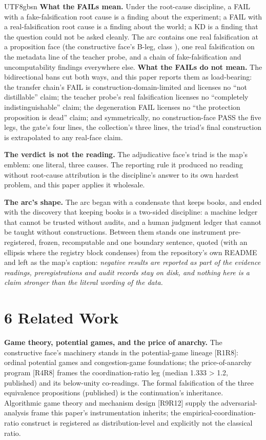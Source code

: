 \documentclass[11pt,letterpaper]{article}
\begin{document}
\begin{CJK}{UTF8}{gbsn}
\textbf{What the FAILs mean.} Under the root-cause discipline, a FAIL with a fake-falsification root cause is a finding about the experiment; a FAIL with a real-falsification root cause is a finding about the world; a KD is a finding that the question could not be asked cleanly. The arc contains one real falsification at a proposition face (the constructive face's B-leg, class ), one real falsification on the metadata line of the teacher probe, and a chain of fake-falsification and uncomputability findings everywhere else. \textbf{What the FAILs do not mean.} The bidirectional bans cut both ways, and this paper reports them as load-bearing: the transfer chain's FAIL is construction-domain-limited and licenses no ``not distillable'' claim; the teacher probe's real falsification licenses no ``completely indistinguishable'' claim; the degeneration FAIL licenses no ``the protection proposition is dead'' claim; and symmetrically, no construction-face PASS \textemdash{} the five legs, the gate's four lines, the collection's three lines, the triad's final construction \textemdash{} is extrapolated to any real-face claim.

\textbf{The verdict is not the reading.} The adjudicative face's triad is the map's emblem: one literal, three causes. The reporting rule it produced \textemdash{} no reading without root-cause attribution \textemdash{} is the discipline's answer to its own hardest problem, and this paper applies it wholesale.

\textbf{The arc's shape.} The arc began with a condensate that keeps books, and ended with the discovery that keeping books is a two-sided discipline: a machine ledger that cannot be trusted without audits, and a human judgment ledger that cannot be taught without constructions. Between them stands one instrument \textemdash{} pre-registered, frozen, recomputable \textemdash{} and one boundary sentence, quoted (with an ellipsis where the registry block condenses) from the repository's own README and left as the map's caption: \emph{negative results are reported as part of the evidence \textellipsis{}readings, preregistrations and audit records stay on disk, and nothing here is a claim stronger than the literal wording of the data.}

\section*{6 Related Work}

\textbf{Game theory, potential games, and the price of anarchy.} The constructive face's machinery stands in the potential-game lineage [R1\textendash{}R8]: ordinal potential games and congestion-game foundations; the price-of-anarchy program [R4\textendash{}R8] frames the coordination-ratio leg (median 1.333 > 1.2, published) and its below-unity co-readings. The formal falsification of the three equivalence propositions (published) is the continuation's inheritance. Algorithmic game theory and mechanism design [R9\textendash{}R12] supply the adversarial-analysis frame this paper's instrumentation inherits; the empirical-coordination-ratio construct is registered as distribution-level and explicitly not the classical ratio.


\end{CJK}
\end{document}
